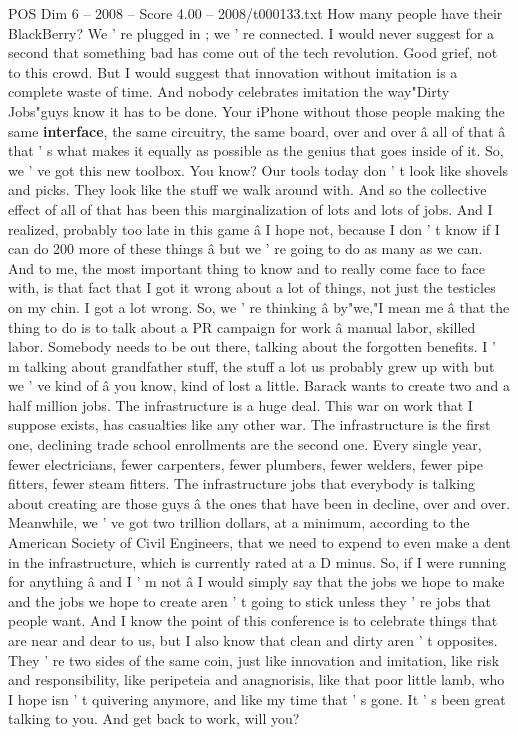 \begin{textsample}{POS Dim 6 – 2008 – Score 4.00 – 2008/t000133.txt}
How many people have their BlackBerry?
We ' re plugged in ; we ' re connected.
I would never suggest for a second that something bad has come out of the tech revolution.
Good grief, not to this crowd.
But I would suggest that innovation without imitation is a complete waste of time.
And nobody celebrates imitation the way"Dirty Jobs"guys know it has to be done.
Your iPhone without those people making the same \textbf{interface}, the same circuitry, the same board, over and over â all of that â that ' s what makes it equally as possible as the genius that goes inside of it.
So, we ' ve got this new toolbox.
You know?
Our tools today don ' t look like shovels and picks.
They look like the stuff we walk around with.
And so the collective effect of all of that has been this marginalization of lots and lots of jobs.
And I realized, probably too late in this game â I hope not, because I don ' t know if I can do 200 more of these things â but we ' re going to do as many as we can.
And to me, the most important thing to know and to really come face to face with, is that fact that I got it wrong about a lot of things, not just the testicles on my chin.
I got a lot wrong.
So, we ' re thinking â by"we,"I mean me â that the thing to do is to talk about a PR campaign for work â manual labor, skilled labor.
Somebody needs to be out there, talking about the forgotten benefits.
I ' m talking about grandfather stuff, the stuff a lot us probably grew up with but we ' ve kind of â you know, kind of lost a little.
Barack wants to create two and a half million jobs.
The infrastructure is a huge deal.
This war on work that I suppose exists, has casualties like any other war.
The infrastructure is the first one, declining trade school enrollments are the second one.
Every single year, fewer electricians, fewer carpenters, fewer plumbers, fewer welders, fewer pipe fitters, fewer steam fitters.
The infrastructure jobs that everybody is talking about creating are those guys â the ones that have been in decline, over and over.
Meanwhile, we ' ve got two trillion dollars, at a minimum, according to the American Society of Civil Engineers, that we need to expend to even make a dent in the infrastructure, which is currently rated at a D minus.
So, if I were running for anything â and I ' m not â I would simply say that the jobs we hope to make and the jobs we hope to create aren ' t going to stick unless they ' re jobs that people want.
And I know the point of this conference is to celebrate things that are near and dear to us, but I also know that clean and dirty aren ' t opposites.
They ' re two sides of the same coin, just like innovation and imitation, like risk and responsibility, like peripeteia and anagnorisis, like that poor little lamb, who I hope isn ' t quivering anymore, and like my time that ' s gone.
It ' s been great talking to you.
And get back to work, will you?

\end{textsample}
